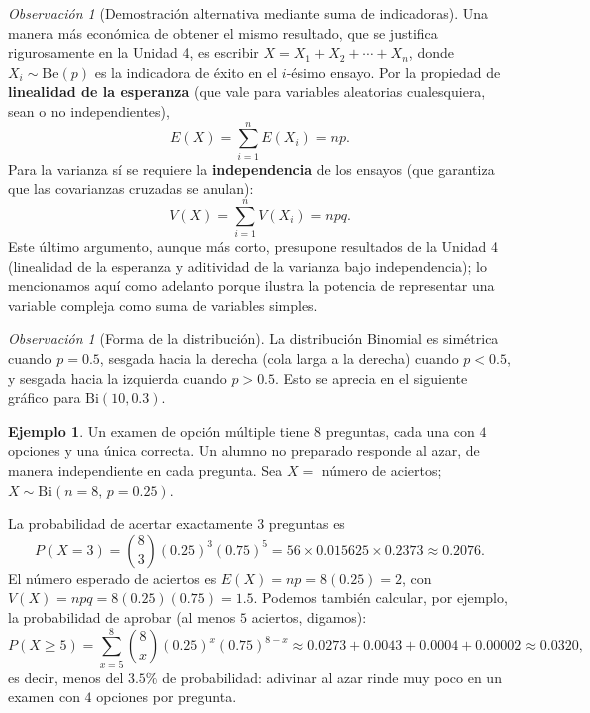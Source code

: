 \documentclass[11pt,a4paper]{article}
\theoremstyle{plain}
\theoremstyle{definition}
\newtheorem{ejemplo}[teorema]{Ejemplo}
\theoremstyle{remark}
\newtheorem{observacion}[teorema]{Observación}
\begin{document}
\begin{observacion}[Demostración alternativa mediante suma de indicadoras]
Una manera más económica de obtener el mismo resultado, que se justifica rigurosamente en la Unidad 4, es escribir $X=X_1+X_2+\cdots+X_n$, donde $X_i\sim\text{Be}(p)$ es la indicadora de éxito en el $i$-ésimo ensayo. Por la propiedad de \textbf{linealidad de la esperanza} (que vale para variables aleatorias cualesquiera, sean o no independientes),
$$E(X)=\sum_{i=1}^n E(X_i)=np.$$
Para la varianza sí se requiere la \textbf{independencia} de los ensayos (que garantiza que las covarianzas cruzadas se anulan):
$$V(X)=\sum_{i=1}^n V(X_i)=npq.$$
Este último argumento, aunque más corto, presupone resultados de la Unidad 4 (linealidad de la esperanza y aditividad de la varianza bajo independencia); lo mencionamos aquí como adelanto porque ilustra la potencia de representar una variable compleja como suma de variables simples.
\end{observacion}

\begin{observacion}[Forma de la distribución]
La distribución Binomial es simétrica cuando $p=0.5$, sesgada hacia la derecha (cola larga a la derecha) cuando $p<0.5$, y sesgada hacia la izquierda cuando $p>0.5$. Esto se aprecia en el siguiente gráfico para $\text{Bi}(10,0.3)$.
\end{observacion}

\begin{center}
\end{center}

\begin{ejemplo}
Un examen de opción múltiple tiene $8$ preguntas, cada una con $4$ opciones y una única correcta. Un alumno no preparado responde al azar, de manera independiente en cada pregunta. Sea $X=$ número de aciertos; $X\sim\text{Bi}(n=8,\,p=0.25)$.

La probabilidad de acertar exactamente $3$ preguntas es
$$P(X=3)=\binom{8}{3}(0.25)^3(0.75)^5=56\times0.015625\times0.2373\approx0.2076.$$
El número esperado de aciertos es $E(X)=np=8(0.25)=2$, con $V(X)=npq=8(0.25)(0.75)=1.5$. Podemos también calcular, por ejemplo, la probabilidad de aprobar (al menos $5$ aciertos, digamos):
$$P(X\ge5)=\sum_{x=5}^8\binom{8}{x}(0.25)^x(0.75)^{8-x}\approx0.0273+0.0043+0.0004+0.00002\approx0.0320,$$
es decir, menos del $3.5\%$ de probabilidad: adivinar al azar rinde muy poco en un examen con $4$ opciones por pregunta.
\end{ejemplo}
\end{document}
